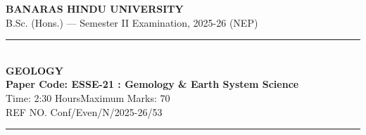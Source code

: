 \documentclass[11pt,a4paper]{article}
\begin{document}
\begin{center}
  {\large\bfseries BANARAS HINDU UNIVERSITY}\\[2pt]
  {\normalsize B.Sc. (Hons.) --- Semester II Examination, 2025-26 (NEP)}\\[6pt]
  \rule{0.8\linewidth}{0.5pt}\\[6pt]
  {\large\bfseries GEOLOGY}\\[4pt]
  {\large\bfseries Paper Code: ESSE-21 : Gemology \& Earth System Science}\\[4pt]
  {\normalsize Time: 2:30 Hours\hfill Maximum Marks: 70}\\[2pt]
  {\small REF NO. Conf/Even/N/2025-26/53}
\end{center}

\rule{\linewidth}{0.4pt}

\smallskip
\end{document}
